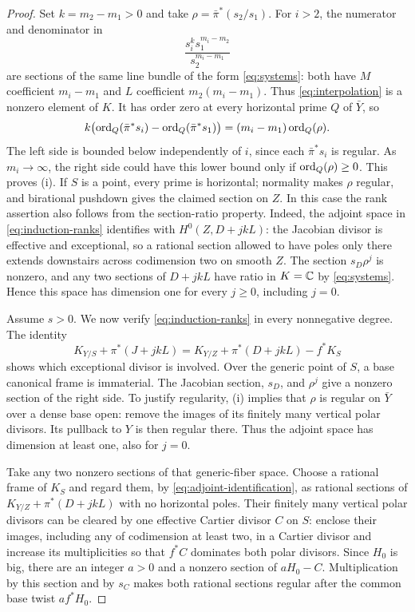 \begin{proof}
Set $k=m_2-m_1>0$ and take
$\rho=\bar\pi^*(s_2/s_1)$. For $i>2$, the numerator and denominator
in
\begin{equation}\label{eq:interpolation}
                  \frac{s_i^k s_1^{m_i-m_2}}
                       {s_2^{m_i-m_1}}
\end{equation}
are sections of the same line bundle of the form
\eqref{eq:systems}: both have $M$ coefficient $m_i-m_1$ and $L$
coefficient $m_2(m_i-m_1)$. Thus \eqref{eq:interpolation} is a
nonzero element of $K$. It has order zero at every horizontal prime
$Q$ of $\bar Y$, so
\begin{equation}\label{eq:horizontal-interpolation}
 k\bigl(\operatorname{ord}_Q(\bar\pi^*s_i)-\operatorname{ord}_Q(\bar\pi^*s_1)\bigr)
        =(m_i-m_1)\operatorname{ord}_Q(\rho).
\end{equation}
The left side is bounded below independently of $i$, since each
$\bar\pi^*s_i$ is regular. As $m_i\to\infty$, the right side could
have this lower bound only if $\operatorname{ord}_Q(\rho)\ge0$. This proves
\textup{(i)}. If $S$ is a point, every prime is horizontal;
normality makes $\rho$ regular, and birational pushdown gives the
claimed section on $Z$. In this case the rank assertion also follows
from the section-ratio property. Indeed, the adjoint space in
\eqref{eq:induction-ranks} identifies with $H^0(Z,D+jkL)$:
the Jacobian divisor is effective and exceptional, so a rational
section allowed to have poles only there extends downstairs across
codimension two on smooth $Z$. The section $s_D\rho^j$ is nonzero,
and any two sections of $D+jkL$ have ratio in $K=\mathbb C$ by
\eqref{eq:systems}. Hence this space has dimension one for every
$j\ge0$, including $j=0$.

Assume $s>0$. We now verify \eqref{eq:induction-ranks} in every
nonnegative degree. The identity
\begin{equation}\label{eq:adjoint-identification}
 K_{Y/S}+\pi^*(J+jkL)
       =K_{Y/Z}+\pi^*(D+jkL)-f^*K_S
\end{equation}
shows which exceptional divisor is involved. Over the generic point
of $S$, a base canonical frame is immaterial. The Jacobian section,
$s_D$, and $\rho^j$ give a nonzero section of the right side.
To justify regularity, \textup{(i)} implies that $\rho$ is regular
on $\bar Y$ over a dense base open: remove the images of its finitely
many vertical polar divisors. Its pullback to $Y$ is then regular
there. Thus the adjoint space has dimension at least one, also for
$j=0$.

Take any two nonzero sections of that generic-fiber space. Choose a
rational frame of $K_S$ and regard them, by
\eqref{eq:adjoint-identification}, as rational sections of
$K_{Y/Z}+\pi^*(D+jkL)$ with no horizontal poles. Their finitely
many vertical polar divisors can be cleared by one effective Cartier
divisor $C$ on $S$: enclose their images, including any of codimension
at least two, in a Cartier divisor and increase its multiplicities so
that $f^*C$ dominates both polar divisors. Since $H_0$ is big, there
are an integer $a>0$ and a nonzero section of $aH_0-C$.
Multiplication by this section and by $s_C$ makes both rational
sections regular after the common base twist $af^*H_0$.


\end{proof}
